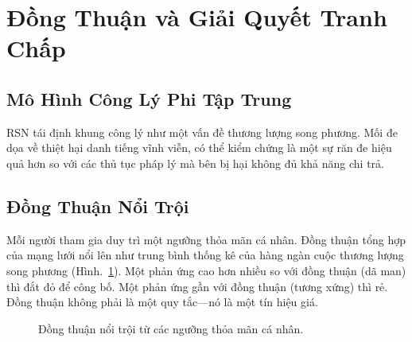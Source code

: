 \documentclass[11pt,a4paper,twocolumn]{article}
\begin{document}
\section{Đồng Thuận và Giải Quyết Tranh Chấp}

\subsection{Mô Hình Công Lý Phi Tập Trung}

RSN tái định khung công lý như một vấn đề thương lượng song phương. Mối đe dọa về thiệt hại danh tiếng vĩnh viễn, có thể kiểm chứng là một sự răn đe hiệu quả hơn so với các thủ tục pháp lý mà bên bị hại không đủ khả năng chi trả.

\subsection{Đồng Thuận Nổi Trội}

Mỗi người tham gia duy trì một ngưỡng thỏa mãn cá nhân. Đồng thuận tổng hợp của mạng lưới nổi lên như trung bình thống kê của hàng ngàn cuộc thương lượng song phương (Hình.~\ref{fig:consensus}). Một phản ứng cao hơn nhiều so với đồng thuận (dã man) thì đắt đỏ để công bố. Một phản ứng gần với đồng thuận (tương xứng) thì rẻ. Đồng thuận không phải là một quy tắc---nó là một tín hiệu giá.

\begin{figure}[ht]
\centering
{}
\caption{Đồng thuận nổi trội từ các ngưỡng thỏa mãn cá nhân.}
\label{fig:consensus}
\end{figure}
\end{document}
